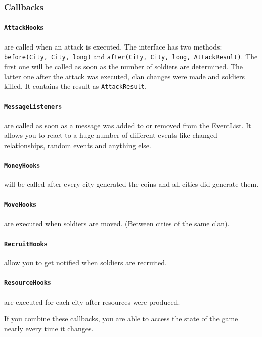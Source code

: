 \documentclass{article}
\begin{document}
    \subsubsection{Callbacks}

    \paragraph{\texttt{AttackHook}s} are called when an attack is executed. The interface has two methods: \texttt{before(City, City, long)} and \texttt{after(City, City, long, AttackResult)}. The first one will
    be called as soon as the number of soldiers are determined. The latter one after the attack was executed, clan changes were made and soldiers killed. It contains the result as \texttt{AttackResult}.

    \paragraph{\texttt{MessageListener}s} are called as soon as a message was added to or removed from the EventList. It allows you to react to a huge number of different events like changed relationships, random events and anything else.

    \paragraph{\texttt{MoneyHook}s} will be called after every city generated the coins and all cities did generate them.

    \paragraph{\texttt{MoveHook}s} are executed when soldiers are moved. (Between cities of the same clan).

    \paragraph{\texttt{RecruitHook}s} allow you to get notified when soldiers are recruited.

    \paragraph{\texttt{ResourceHook}s} are executed for each city after resources were produced.\newline

    If you combine these callbacks, you are able to access the state of the game nearly every time it changes.
\end{document}

